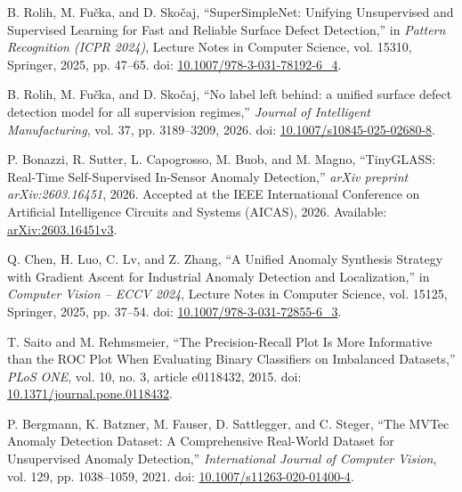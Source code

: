 B. Rolih, M. Fu\v{c}ka, and D. Sko\v{c}aj,
``SuperSimpleNet: Unifying Unsupervised and Supervised
Learning for Fast and Reliable Surface Defect Detection,''
in \textit{Pattern Recognition (ICPR 2024)},
Lecture Notes in Computer Science, vol. 15310,
Springer, 2025, pp. 47--65.
doi:
\href{https://doi.org/10.1007/978-3-031-78192-6_4}
{10.1007/978-3-031-78192-6\_4}.

B. Rolih, M. Fu\v{c}ka, and D. Sko\v{c}aj,
``No label left behind: a unified surface defect detection
model for all supervision regimes,''
\textit{Journal of Intelligent Manufacturing},
vol. 37, pp. 3189--3209, 2026.
doi:
\href{https://doi.org/10.1007/s10845-025-02680-8}
{10.1007/s10845-025-02680-8}.

P. Bonazzi, R. Sutter, L. Capogrosso,
M. Buob, and M. Magno,
``TinyGLASS: Real-Time Self-Supervised In-Sensor
Anomaly Detection,''
\textit{arXiv preprint arXiv:2603.16451}, 2026.
Accepted at the IEEE International Conference on
Artificial Intelligence Circuits and Systems (AICAS), 2026.
Available:
\href{https://arxiv.org/abs/2603.16451v3}
{arXiv:2603.16451v3}.

Q. Chen, H. Luo, C. Lv, and Z. Zhang,
``A Unified Anomaly Synthesis Strategy with Gradient Ascent
for Industrial Anomaly Detection and Localization,''
in \textit{Computer Vision -- ECCV 2024},
Lecture Notes in Computer Science, vol. 15125,
Springer, 2025, pp. 37--54.
doi:
\href{https://doi.org/10.1007/978-3-031-72855-6_3}
{10.1007/978-3-031-72855-6\_3}.

T. Saito and M. Rehmsmeier,
``The Precision-Recall Plot Is More Informative than the ROC Plot
When Evaluating Binary Classifiers on Imbalanced Datasets,''
\textit{PLoS ONE}, vol. 10, no. 3, article e0118432, 2015.
doi: \href{https://doi.org/10.1371/journal.pone.0118432}
{10.1371/journal.pone.0118432}.

P. Bergmann, K. Batzner, M. Fauser, D. Sattlegger, and C. Steger,
``The MVTec Anomaly Detection Dataset: A Comprehensive Real-World
Dataset for Unsupervised Anomaly Detection,''
\textit{International Journal of Computer Vision},
vol. 129, pp. 1038--1059, 2021.
doi: \href{https://doi.org/10.1007/s11263-020-01400-4}
{10.1007/s11263-020-01400-4}.
